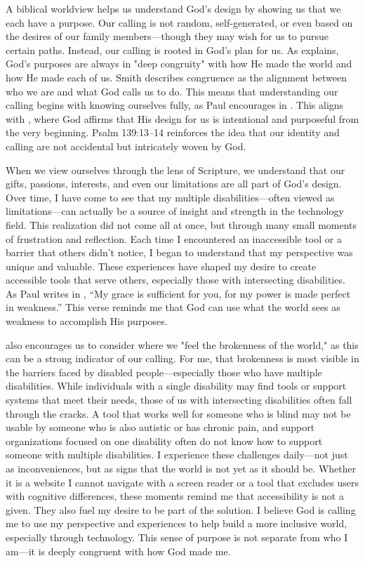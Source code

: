 \documentclass[stu,12pt,floatsintext]{apa7}
\begin{document}
A biblical worldview helps us understand God's design by showing us that we each have a purpose. Our calling is not random, self-generated, or even based on the desires of our family members—though they may wish for us to pursue certain paths. Instead, our calling is rooted in God's plan for us. As \textcite{Smith2024} explains, God's purposes are always in "deep congruity" with how He made the world and how He made each of us. Smith describes congruence as the alignment between who we are and what God calls us to do. This means that understanding our calling begins with knowing ourselves fully, as Paul encourages in \textcite[Romans 12:3]{Tyndale1996}. This aligns with \textcite[Jeremiah 1:5]{Tyndale1996}, where God affirms that His design for us is intentional and purposeful from the very beginning. Psalm 139:13–14 reinforces the idea that our identity and calling are not accidental but intricately woven by God.

When we view ourselves through the lens of Scripture, we understand that our gifts, passions, interests, and even our limitations are all part of God's design. Over time, I have come to see that my multiple disabilities—often viewed as limitations—can actually be a source of insight and strength in the technology field. This realization did not come all at once, but through many small moments of frustration and reflection. Each time I encountered an inaccessible tool or a barrier that others didn’t notice, I began to understand that my perspective was unique and valuable. These experiences have shaped my desire to create accessible tools that serve others, especially those with intersecting disabilities. As Paul writes in \textcite[2 Corinthians 12:9]{Tyndale1996}, “My grace is sufficient for you, for my power is made perfect in weakness.” This verse reminds me that God can use what the world sees as weakness to accomplish His purposes.

\textcite[chapter 3]{Smith2024} also encourages us to consider where we "feel the brokenness of the world," as this can be a strong indicator of our calling. For me, that brokenness is most visible in the barriers faced by disabled people—especially those who have multiple disabilities. While individuals with a single disability may find tools or support systems that meet their needs, those of us with intersecting disabilities often fall through the cracks. A tool that works well for someone who is blind may not be usable by someone who is also autistic or has chronic pain, and support organizations focused on one disability often do not know how to support someone with multiple disabilities. I experience these challenges daily—not just as inconveniences, but as signs that the world is not yet as it should be. Whether it is a website I cannot navigate with a screen reader or a tool that excludes users with cognitive differences, these moments remind me that accessibility is not a given. They also fuel my desire to be part of the solution. I believe God is calling me to use my perspective and experiences to help build a more inclusive world, especially through technology. This sense of purpose is not separate from who I am—it is deeply congruent with how God made me.
\end{document}
